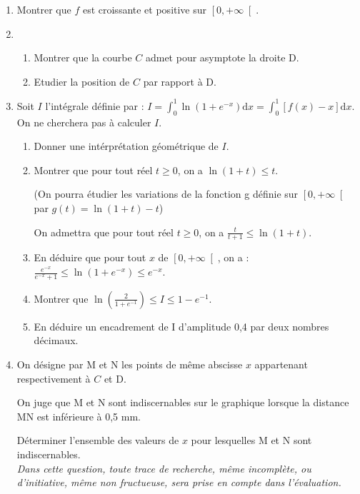 \begin{center}

\end{center}
\begin{enumerate}
     \item
     Montrer que $f$ est croissante et positive sur $\left[0 , +\infty \right[$.
     \item
     \begin{enumerate}[label=\alph*.]
          \item
          Montrer que la courbe $C$ admet pour asymptote la droite D.
          \item
          Etudier la position de $C$ par rapport à D.
     \end{enumerate}
     \item
     Soit $I$ l'intégrale définie par : $I= \int_{0}^{1} \ln\left(1+e^{-x}\right) \text{d}x= \int_{0}^{1} \left[f\left(x\right)-x\right] \text{d}x $. On ne cherchera pas à calculer $I$.
     \begin{enumerate}[label=\alph*.]
          \item
          Donner une intérprétation géométrique de $I$.
          \item
          Montrer que pour tout réel $t \geqslant 0$, on a $\ln\left(1+t\right) \leqslant t$.
          \par
          (On pourra étudier les variations de la fonction g définie sur $\left[0,+\infty \right[$ par $g\left(t\right)=\ln\left(1+t\right)-t$)
          \par
          On admettra que pour tout réel $t \geqslant 0$, on a $\frac{t}{t+1} \leqslant \ln\left(1+t\right)$.
          \item
          En déduire que pour tout $x$ de $\left[0 , +\infty \right[$, on a : $\frac{e^{-x}}{e^{-x}+1} \leqslant \ln\left(1+e^{-x}\right) \leqslant e^{-x}$.
          \item
          Montrer que $\ln\left(\frac{2}{1+e^{-1}}\right) \leqslant I \leqslant 1-e^{-1}$.
          \item
          En déduire un encadrement de I d'amplitude 0,4 par deux nombres décimaux.
     \end{enumerate}
     \item
     On désigne par M et N les points de même abscisse $x$ appartenant respectivement à $C$ et D.
     \par
     On juge que M et N sont indiscernables sur le graphique lorsque la distance MN est inférieure à 0,5 mm.
     \par
     Déterminer l'ensemble des valeurs de $x$ pour lesquelles M et N sont indiscernables.
\\
     \textit{Dans cette question, toute trace de recherche, même incomplète, ou d'initiative, même non fructueuse, sera prise en compte dans l'évaluation.}
\end{enumerate}
\begin{corrige}

\end{corrige}

